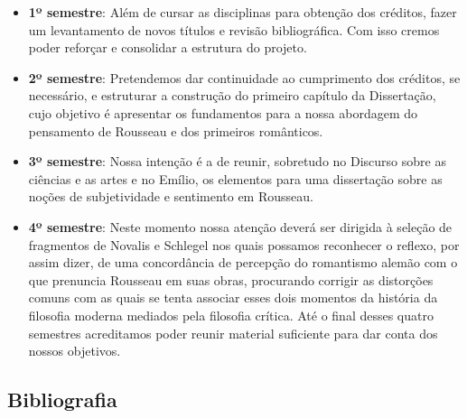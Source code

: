 \documentclass[
  brazilian,
  letterpaper,
  DIV=11,
  numbers=noendperiod]{scrartcl}
\providecommand{\tightlist}{%
  \setlength{\itemsep}{0pt}\setlength{\parskip}{0pt}}
\begin{document}
\begin{itemize}
\tightlist
\item
  \textbf{1º semestre}: Além de cursar as disciplinas para obtenção dos
  créditos, fazer um levantamento de novos títulos e revisão
  bibliográfica. Com isso cremos poder reforçar e consolidar a estrutura
  do projeto.
\item
  \textbf{2º semestre}: Pretendemos dar continuidade ao cumprimento dos
  créditos, se necessário, e estruturar a construção do primeiro
  capítulo da Dissertação, cujo objetivo é apresentar os fundamentos
  para a nossa abordagem do pensamento de Rousseau e dos primeiros
  românticos.
\item
  \textbf{3º semestre}: Nossa intenção é a de reunir, sobretudo no
  Discurso sobre as ciências e as artes e no Emílio, os elementos para
  uma dissertação sobre as noções de subjetividade e sentimento em
  Rousseau.
\item
  \textbf{4º semestre}: Neste momento nossa atenção deverá ser dirigida
  à seleção de fragmentos de Novalis e Schlegel nos quais possamos
  reconhecer o reflexo, por assim dizer, de uma concordância de
  percepção do romantismo alemão com o que prenuncia Rousseau em suas
  obras, procurando corrigir as distorções comuns com as quais se tenta
  associar esses dois momentos da história da filosofia moderna mediados
  pela filosofia crítica. Até o final desses quatro semestres
  acreditamos poder reunir material suficiente para dar conta dos nossos
  objetivos.
\end{itemize}

\subsection*{Bibliografia}\label{bibliografia}
\end{document}
